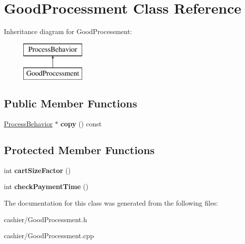 \hypertarget{classGoodProcessment}{\section{Good\-Processment Class Reference}
\label{classGoodProcessment}
}
Inheritance diagram for Good\-Processment\-:\begin{figure}[H]
\begin{center}
\leavevmode
\includegraphics[height=2.000000cm]{classGoodProcessment}
\end{center}
\end{figure}
\subsection*{Public Member Functions}
\begin{DoxyCompactItemize}
\item 
\hypertarget{classGoodProcessment_a1c2dfca6ae6c4ab034dfcfc423bf338b}{\hyperlink{classProcessBehavior}{Process\-Behavior} $\ast$ {\bfseries copy} () const }\label{classGoodProcessment_a1c2dfca6ae6c4ab034dfcfc423bf338b}

\end{DoxyCompactItemize}
\subsection*{Protected Member Functions}
\begin{DoxyCompactItemize}
\item 
\hypertarget{classGoodProcessment_a99170ba3993e1511cc1fa82aba883bbc}{int {\bfseries cart\-Size\-Factor} ()}\label{classGoodProcessment_a99170ba3993e1511cc1fa82aba883bbc}

\item 
\hypertarget{classGoodProcessment_a126bda449e47094c49f501dcb0cb5d88}{int {\bfseries check\-Payment\-Time} ()}\label{classGoodProcessment_a126bda449e47094c49f501dcb0cb5d88}

\end{DoxyCompactItemize}


The documentation for this class was generated from the following files\-:\begin{DoxyCompactItemize}
\item 
cashier/Good\-Processment.\-h\item 
cashier/Good\-Processment.\-cpp\end{DoxyCompactItemize}
